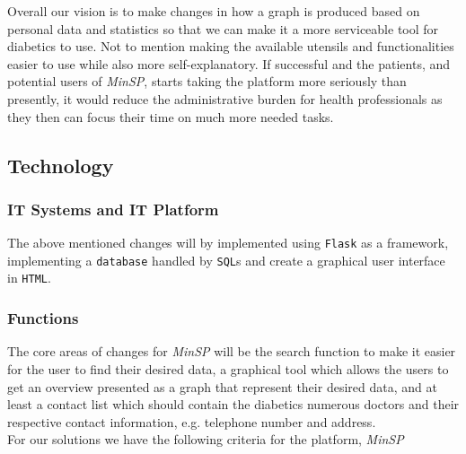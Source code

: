 \documentclass[a4paper,11pt]{article}
\begin{document}
Overall our vision is to make changes in how a graph is produced based on personal data and statistics so that we can make it a more serviceable tool for diabetics to use. Not to mention making the available utensils and functionalities easier to use while also more self-explanatory. If successful and the patients, and potential users of \textit{MinSP}, starts taking the platform more seriously than presently, it would reduce the administrative burden for health professionals as they then can focus their time on much more needed tasks.

\subsection{Technology}


\subsubsection{IT Systems and IT Platform}

The above mentioned changes will by implemented using \texttt{Flask} as a framework, implementing a \texttt{database} handled by \texttt{SQL}s and create a graphical user interface in \texttt{HTML}.\\

\subsubsection{Functions}
The core areas of changes for \textit{MinSP} will be the search function to make it easier for the user to find their desired data, a graphical tool which allows the users to get an overview presented as a graph that represent their desired data, and at least a contact list which should contain the diabetics numerous doctors and their respective contact information, e.g. telephone number and address.\\

For our solutions we have the following criteria for the platform, \textit{MinSP}
\end{document}
